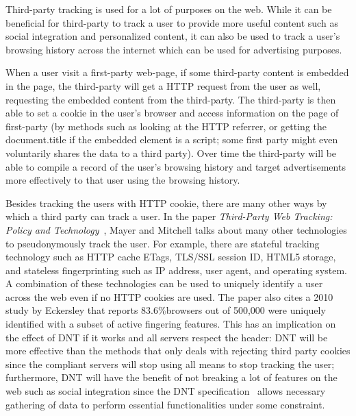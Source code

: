 \documentclass{sig-alternate}
\begin{document}
Third-party tracking is used for a lot of purposes on the web. While it can be beneficial for third-party to track a user to provide more useful content such as social integration and personalized content, it can also be used to track a user's browsing history across the internet which can be used for advertising purposes. 

When a user visit a first-party web-page, if some third-party content is embedded in the page, the third-party will get a HTTP request from the user as well, requesting the embedded content from the third-party. The third-party is then able to set a cookie in the user’s browser and access information on the page of first-party (by methods such as looking at the HTTP referrer, or getting the document.title if the embedded element is a script; some first party might even voluntarily shares the data to a third party). Over time the third-party will be able to compile a record of the user's browsing history and target advertisements more effectively to that user using the browsing history.

Besides tracking the users with HTTP cookie, there are many other ways by which a third party can track a user. In the paper \emph{Third-Party Web Tracking: Policy and Technology}~\cite{mayer2012third}, Mayer and Mitchell talks about many other technologies to pseudonymously track the user. For example, there are stateful tracking technology such as HTTP cache ETags, TLS/SSL session ID, HTML5 storage, and stateless fingerprinting such as IP address, user agent, and operating system. A combination of these technologies can be used to uniquely identify a user across the web even if no HTTP cookies are used. The paper also cites a 2010 study by Eckersley that reports 83.6\%browsers out of 500,000 were uniquely identified with a subset of active fingering features. This has an implication on the effect of DNT if it works and all servers respect the header: DNT will be more effective than the methods that only deals with rejecting third party cookies since the compliant servers will stop using all means to stop tracking the user; furthermore, DNT will have the benefit of not breaking a lot of features on the web such as social integration since the DNT specification~\cite{tracking_compliance_20130430} allows necessary gathering of data to perform essential functionalities under some constraint. 
\end{document}
